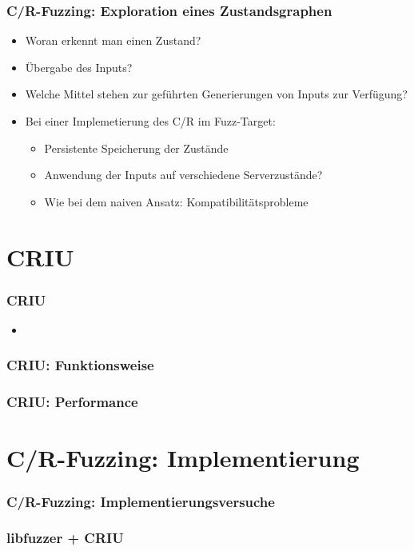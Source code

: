 \documentclass[handout]{beamer}
\begin{document}
\begin{frame}
    \frametitle{C/R-Fuzzing: Exploration eines Zustandsgraphen}
    \begin{itemize}
        \item Woran erkennt man einen Zustand?
        \item Übergabe des Inputs?
        \item Welche Mittel stehen zur geführten Generierungen von Inputs zur Verfügung?
        \item Bei einer Implemetierung des C/R im Fuzz-Target:
            \begin{itemize}
                \item Persistente Speicherung der Zustände
                \item Anwendung der Inputs auf verschiedene Serverzustände?
                \item Wie bei dem naiven Ansatz: Kompatibilitätsprobleme
            \end{itemize}
    \end{itemize}
\end{frame}

\section{CRIU}
\begin{frame}
    \frametitle{CRIU}
    \begin{itemize}
        \item
    \end{itemize}
\end{frame}

\begin{frame}
    \frametitle{CRIU: Funktionsweise}
\end{frame}

\begin{frame}
    \frametitle{CRIU: Performance}
\end{frame}

\section{C/R-Fuzzing: Implementierung}
\begin{frame}
    \frametitle{C/R-Fuzzing: Implementierungsversuche}
\end{frame}

\begin{frame}
    \frametitle{libfuzzer + CRIU}
\end{frame}
\end{document}
